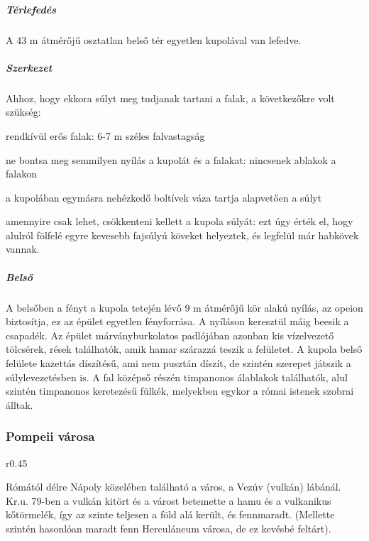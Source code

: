 	
	\subparagraph{Térlefedés}
	A 43 m átmérőjű osztatlan belső tér egyetlen kupolával van lefedve.
	
	\subparagraph{Szerkezet}
	Ahhoz, hogy ekkora súlyt meg tudjanak tartani a falak, a következőkre volt szükség:
	\begin{compactitem}
		\item rendkívül erős falak: 6-7 m széles falvastagság
		\item ne bontsa meg semmilyen nyílás a kupolát és a falakat: nincsenek ablakok a falakon
		\item a kupolában egymásra nehézkedő boltívek váza tartja alapvetően a súlyt
		\item amennyire csak lehet, csökkenteni kellett a kupola súlyát: ezt úgy érték el, hogy alulról fölfelé egyre kevesebb fajsúlyú köveket helyeztek, és legfelül már habkövek vannak.
	\end{compactitem}

	\subparagraph{Belső}
	A belsőben a fényt a kupola tetején lévő 9 m átmérőjű kör alakú nyílás, az opeion biztosítja, ez az épület egyetlen fényforrása. A nyíláson keresztül máig beesik a csapadék. Az épület márványburkolatos padlójában azonban kis vízelvezető tölcsérek, rések találhatók, amik hamar szárazzá teszik a felületet. A kupola belső felülete kazettás díszítésű, ami nem pusztán díszít, de szintén szerepet játszik a súlylevezetésben is. A fal középső részén timpanonos álablakok találhatók, alul szintén timpanonos keretezésű fülkék, melyekben egykor a római istenek szobrai álltak.

\subsubsection{Pompeii városa}

\begin{wrapfigure}{r}{0.45\textwidth}
\end{wrapfigure}

Rómától délre Nápoly közelében található a város, a Vezúv (vulkán) lábánál. Kr.u. 79-ben a vulkán kitört és a várost betemette a hamu és a vulkanikus kőtörmelék, így az szinte teljesen a föld alá került, és fennmaradt. (Mellette szintén hasonlóan maradt fenn Herculáneum városa, de ez kevésbé feltárt).

